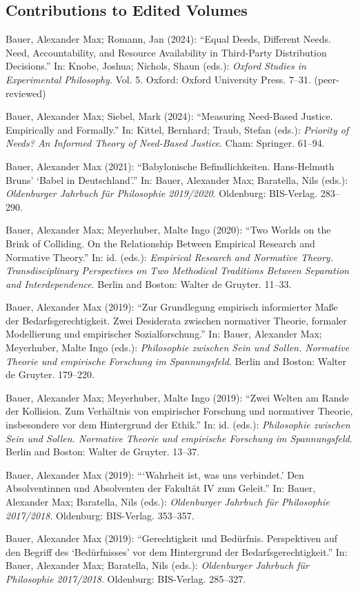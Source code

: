 \documentclass[a4paper,10pt]{article}
\newenvironment{literature}{%
   \parskip6pt\parindent0pt\raggedright
   \def\lititem{\hangindent=1cm\hangafter1}}{%
   \par\ignorespaces}
\begin{document}
\subsection*{Contributions to Edited Volumes}
\begin{literature}
\lititem Bauer, Alexander Max; Romann, Jan (2024): \enquote{Equal Deeds, Different Needs. Need, Accountability, and Resource Availability in Third-Party Distribution Decisions.} In: Knobe, Joshua; Nichols, Shaun (eds.): \textit{Oxford Studies in Experimental Philosophy}. Vol. 5. Oxford: Oxford University Press. 7--31. (peer-reviewed)

\lititem Bauer, Alexander Max; Siebel, Mark (2024): \enquote{Measuring Need-Based Justice. Empirically and Formally.} In: Kittel, Bernhard; Traub, Stefan (eds.): \textit{Priority of Needs? An Informed Theory of Need-Based Justice}. Cham: Springer. 61--94.

\lititem Bauer, Alexander Max (2021): \enquote{Babylonische Befindlichkeiten. Hans-Helmuth Bruns' \enquote{Babel in Deutschland}.} In: Bauer, Alexander Max; Baratella, Nils (eds.): \textit{Oldenburger Jahrbuch für Philosophie 2019/2020}. Oldenburg: BIS-Verlag. 283--290.

\lititem Bauer, Alexander Max; Meyerhuber, Malte Ingo (2020): \enquote{Two Worlds on the Brink of Colliding. On the Relationship Between Empirical Research and Normative Theory.} In: id. (eds.): \textit{Empirical Research and Normative Theory. Transdisciplinary Perspectives on Two Methodical Traditions Between Separation and Interdependence}. Berlin and Boston: Walter de Gruyter. 11--33.

\lititem Bauer, Alexander Max (2019): \enquote{Zur Grundlegung empirisch informierter Maße der Bedarfsgerechtigkeit. Zwei Desiderata zwischen normativer Theorie, formaler Modellierung und empirischer Sozialforschung.} In: Bauer, Alexander Max; Meyerhuber, Malte Ingo (eds.): \textit{Philosophie zwischen Sein und Sollen. Normative Theorie und empirische Forschung im Spannungsfeld}. Berlin and Boston: Walter de Gruyter. 179--220.

\lititem Bauer, Alexander Max; Meyerhuber, Malte Ingo (2019): \enquote{Zwei Welten am Rande der Kollision. Zum Verhältnis von empirischer Forschung und normativer Theorie, insbesondere vor dem Hintergrund der Ethik.} In: id. (eds.): \textit{Philosophie zwischen Sein und Sollen. Normative Theorie und empirische Forschung im Spannungsfeld}. Berlin and Boston: Walter de Gruyter. 13--37.

\lititem Bauer, Alexander Max (2019): \enquote{\enquote{Wahrheit ist, was uns verbindet.} Den Absolventinnen und Absolventen der Fakultät IV zum Geleit.} In: Bauer, Alexander Max; Baratella, Nils (eds.): \textit{Oldenburger Jahrbuch für Philosophie 2017/2018}. Oldenburg: BIS-Verlag. 353--357.

\lititem Bauer, Alexander Max (2019): \enquote{Gerechtigkeit und Bedürfnis. Perspektiven auf den Begriff des \enquote{Bedürfnisses} vor dem Hintergrund der Bedarfsgerechtigkeit.} In: Bauer, Alexander Max; Baratella, Nils (eds.): \textit{Oldenburger Jahrbuch für Philosophie 2017/2018}. Oldenburg: BIS-Verlag. 285--327.
\end{literature}
\end{document}
